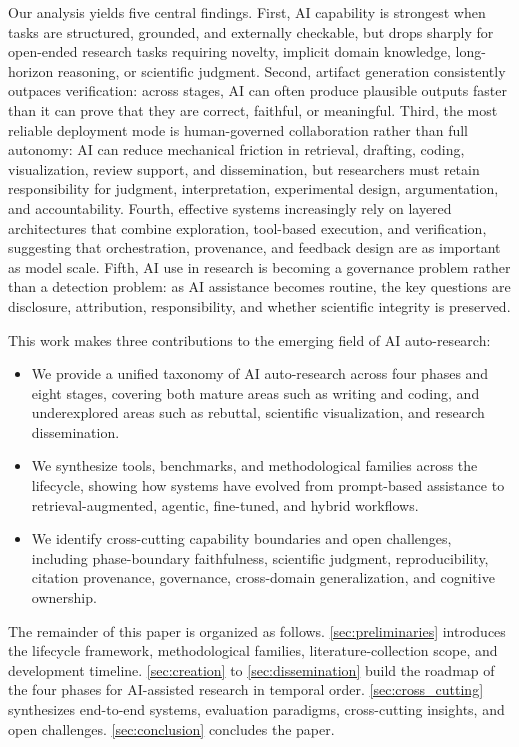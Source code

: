 Our analysis yields five central findings. First, AI capability is strongest when tasks are structured, grounded, and externally checkable, but drops sharply for open-ended research tasks requiring novelty, implicit domain knowledge, long-horizon reasoning, or scientific judgment. Second, artifact generation consistently outpaces verification: across stages, AI can often produce plausible outputs faster than it can prove that they are correct, faithful, or meaningful. Third, the most reliable deployment mode is human-governed collaboration rather than full autonomy: AI can reduce mechanical friction in retrieval, drafting, coding, visualization, review support, and dissemination, but researchers must retain responsibility for judgment, interpretation, experimental design, argumentation, and accountability. Fourth, effective systems increasingly rely on layered architectures that combine exploration, tool-based execution, and verification, suggesting that orchestration, provenance, and feedback design are as important as model scale. Fifth, AI use in research is becoming a governance problem rather than a detection problem: as AI assistance becomes routine, the key questions are disclosure, attribution, responsibility, and whether scientific integrity is preserved.

This work makes three contributions to the emerging field of AI auto-research:

\begin{itemize}

    \item We provide a unified taxonomy of AI auto-research across four phases and eight stages, covering both mature areas such as writing and coding, and underexplored areas such as rebuttal, scientific visualization, and research dissemination.

    \item We synthesize tools, benchmarks, and methodological families across the lifecycle, showing how systems have evolved from prompt-based assistance to retrieval-augmented, agentic, fine-tuned, and hybrid workflows.

    \item We identify cross-cutting capability boundaries and open challenges, including phase-boundary faithfulness, scientific judgment, reproducibility, citation provenance, governance, cross-domain generalization, and cognitive ownership.
\end{itemize}

The remainder of this paper is organized as follows. \cref{sec:preliminaries} introduces the lifecycle framework, methodological families, literature-collection scope, and development timeline. \cref{sec:creation} to \cref{sec:dissemination} build the roadmap of the four phases for AI-assisted research in temporal order. \cref{sec:cross_cutting} synthesizes end-to-end systems, evaluation paradigms, cross-cutting insights, and open challenges. \cref{sec:conclusion} concludes the paper.






